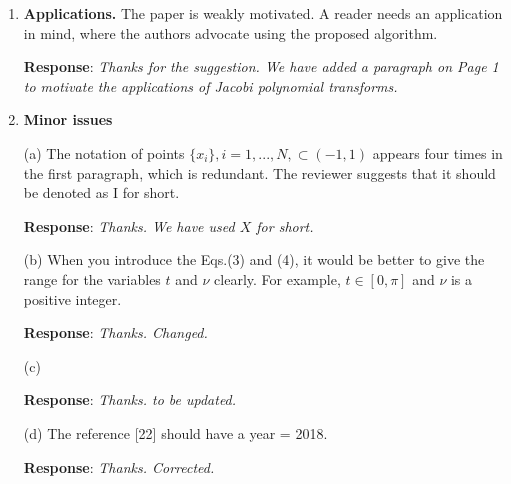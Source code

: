 \documentclass[11pt]{article}
\newcommand{\Response}{{\bf Response}}
\begin{document}
\begin{enumerate}
(b)  \textbf{Numerical stability.} No discussion is presented of the stability of any of these
fast transformations, which presumably may be quite poorly conditioned. It
would be nice to check if the fast transforms are actually accurate numerical
inverses. Something like 
\begin{equation}
\| Backward transform (Forward transform(v)) - v \|_{2}/\|v\|_2
\end{equation}
for some random vector $v$ will do.

\Response: {\it Thanks for your advice. In the case of ``uniform" transform, the transformation matrix is orthonormal after weighting and hence the condition number is $1$. Hence, the forward and inerse transforms are well-conditioned. Our method is based on an approximation to these orthonormal matrices and hence the resulting algorithms are also well conditioned. We are not aware of any ill-conditioning issue as raised by the reviewer. May the reviewer explain more on this issue if our understanding is not correct? Thanks.

In the case of ``nonuniform" transform, we do not aim at a fast inverse, which is left for future work. }

\item {{\textbf{Applications.} The paper is weakly motivated. A reader needs an application in
mind, where the authors advocate using the proposed algorithm.}}

\Response: {\it Thanks for the suggestion. We have added a paragraph on Page 1 to motivate the applications of Jacobi polynomial transforms. }

\item \textbf{Minor issues}

(a) The notation of points $\{x_{i}\},i=1,...,N,\subset (-1,1)$ appears four times in the first
paragraph, which is redundant. The reviewer suggests that it should be denoted as I for short.

\Response: {\it Thanks. We have used $X$ for short.}

(b) When you introduce the Eqs.(3) and (4), it would be better to give the range
for the variables $t$ and $\nu$ clearly. For example, $t \in [0, \pi]$ and $\nu$ is a positive
integer.

\Response: {\it Thanks. Changed.}

(c) {\color{red}{What are the boundary/initial conditions for the third order ODE (22)?}}

\Response: {\it Thanks. to be updated.}

(d) The reference [22] should have a year = 2018.

\Response: {\it Thanks. Corrected. }


\end{enumerate}
\end{document}

